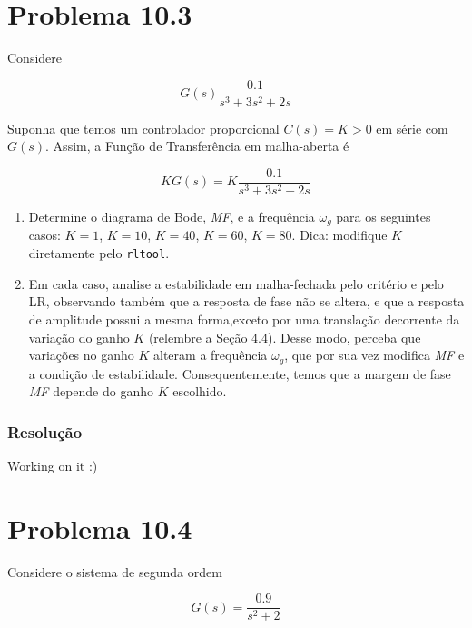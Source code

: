 \documentclass[
]{book}
\providecommand{\tightlist}{%
  \setlength{\itemsep}{0pt}\setlength{\parskip}{0pt}}
\theoremstyle{definition}
\theoremstyle{definition}
\theoremstyle{definition}
\theoremstyle{remark}
\begin{document}
\hypertarget{problema-10.3}{%
\section*{Problema 10.3}\label{problema-10.3}}

Considere

\[
G(s) \frac{0.1}{s^3+3s^2+2s}
\]

Suponha que temos um controlador proporcional \(C(s) = K > 0\) em série com \(G(s)\). Assim, a Função de Transferência em malha-aberta é

\[
KG(s) = K\frac{0.1}{s^3+3s^2+2s}
\]

\begin{enumerate}
\def\labelenumi{\alph{enumi}.}
\tightlist
\item
  Determine o diagrama de Bode, \emph{MF}, e a frequência \(\omega_g\) para os seguintes casos: \(K=1\), \(K=10\), \(K=40\), \(K=60\), \(K=80\). Dica: modifique \(K\) diretamente pelo \texttt{rltool}.
\item
  Em cada caso, analise a estabilidade em malha-fechada pelo critério e pelo LR, observando também que a resposta de fase não se altera, e que a resposta de amplitude possui a mesma forma,exceto por uma translação decorrente da variação do ganho \(K\) (relembre a Seção 4.4). Desse modo, perceba que variações no ganho \(K\) alteram a frequência \(\omega_g\), que por sua vez modifica \emph{MF} e a condição de estabilidade. Consequentemente, temos que a margem de fase \emph{MF} depende do ganho \(K\) escolhido.
\end{enumerate}

\hypertarget{resoluuxe7uxe3o-36}{%
\subsubsection*{Resolução}\label{resoluuxe7uxe3o-36}}

Working on it :)

\hypertarget{problema-10.4}{%
\section*{Problema 10.4}\label{problema-10.4}}

Considere o sistema de segunda ordem

\[
G(s) = \frac{0.9}{s^2+2}
\]
\end{document}

